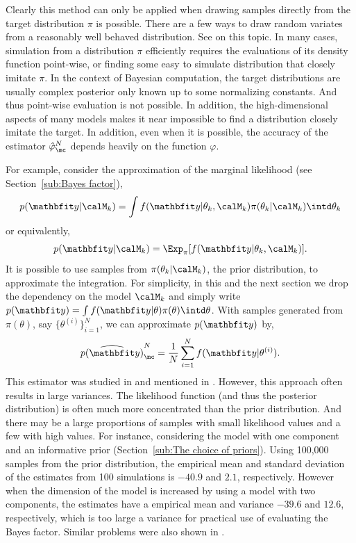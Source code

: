 Clearly this method can only be applied when drawing samples directly from the
target distribution $\pi$ is possible. There are a few ways to draw random
variates from a reasonably well behaved distribution. See
\cite[][chap.~2]{Robert:2004tn} on this topic. In many cases, simulation from
a distribution $\pi$ efficiently requires the evaluations of its density
function point-wise, or finding some easy to simulate distribution that
closely imitate $\pi$. In the context of Bayesian computation, the target
distributions are usually complex posterior only known up to some normalizing
constants. And thus point-wise evaluation is not possible. In addition, the
high-dimensional aspects of many models makes it near impossible to find a
distribution closely imitate the target. In addition, even when it is
possible, the accuracy of the estimator $\hat\varphi_{\mc}^N$ depends heavily
on the function $\varphi$.


For example, consider the approximation of the marginal likelihood (see
Section~\ref{sub:Bayes factor}),
\begin{equation*}
  p(\data|\calM_k) =
  \int f(\data|\theta_k,\calM_k)\pi(\theta_k|\calM_k) \intd \theta_k
\end{equation*}
or equivalently,
\begin{equation*}
  p(\data|\calM_k) = \Exp_{\pi}[f(\data|\theta_k,\calM_k)].
  \label{eq:prior expectation}
\end{equation*}
It is possible to use samples from $\pi(\theta_k|\calM_k)$, the prior
distribution, to approximate the integration. For simplicity, in this and the
next section we drop the dependency on the model $\calM_k$ and simply write
$p(\data) = \int f(\data|\theta)\pi(\theta)\intd\theta$. With samples
generated from $\pi(\theta)$, say $\{\theta^{(i)}\}_{i=1}^N$, we can
approximate $p(\data)$ by,
\begin{equation}
  \widehat{p(\data)}_{\mc}^N = \frac{1}{N}\sum_{i=1}^N f(\data|\theta^{(i)}).
\end{equation}
This estimator was studied in \cite{McCulloch:1991vx} and mentioned in
\cite{Kass:1995vb}. However, this approach often results in large variances.
The likelihood function (and thus the posterior distribution) is often much
more concentrated than the prior distribution. And there may be a large
proportions of samples with small likelihood values and a few with high
values. For instance, considering the \pet model with one component and an
informative prior (Section~\ref{sub:The choice of priors}). Using 100,000
samples from the prior distribution, the empirical mean and standard deviation
of the estimates from 100 simulations is $-40.9$ and $2.1$, respectively.
However when the dimension of the model is increased by using a model with two
components, the estimates have a empirical mean and variance $-39.6$ and
$12.6$, respectively, which is too large a variance for practical use of
evaluating the Bayes factor. Similar problems were also shown in
\cite{McCulloch:1991vx}.

